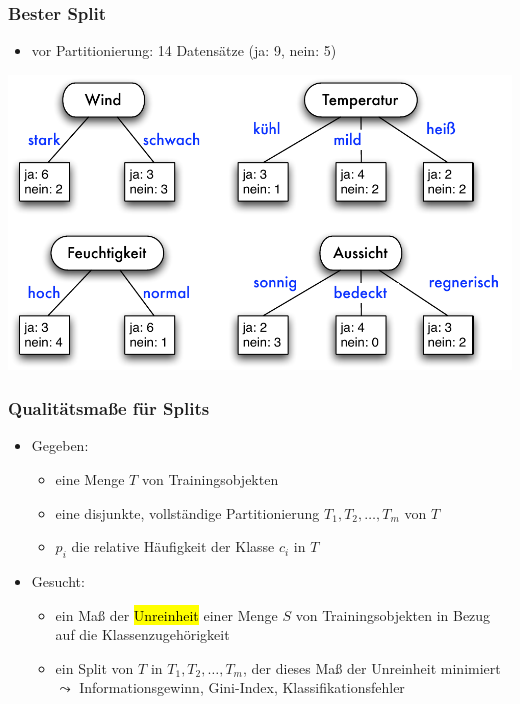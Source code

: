 \begin{frame}
\frametitle{Bester Split}

\begin{itemize}
\item vor Partitionierung: 14 Datensätze (ja: 9, nein: 5)
\end{itemize}

\begin{center}
\includegraphics[scale=.5]{fig7/split-bewertung.pdf}
\end{center}

\begin{center}
\end{center}
\end{frame}

\begin{frame}
\frametitle{Qualitätsmaße für Splits}

\begin{itemize}
\item Gegeben:
\begin{itemize}
\item eine Menge $T$ von Trainingsobjekten
\item eine disjunkte, vollständige Partitionierung $T_1, T_2, \dots,
  T_m$  von $T$
\item $p_i$ die relative Häufigkeit der Klasse $c_i$ in $T$
\end{itemize}
\item Gesucht:
\begin{itemize}
\item ein Maß der \hl{Unreinheit} einer Menge $S$ von
  Trainingsobjekten in Bezug  auf  die Klassenzugehörigkeit
\item ein Split von $T$ in $T_1, T_2, \dots, T_m$, der dieses Maß der
  Unreinheit minimiert \\
$\leadsto$ Informationsgewinn, Gini-Index, Klassifikationsfehler
\end{itemize}
\end{itemize}

\end{frame}

